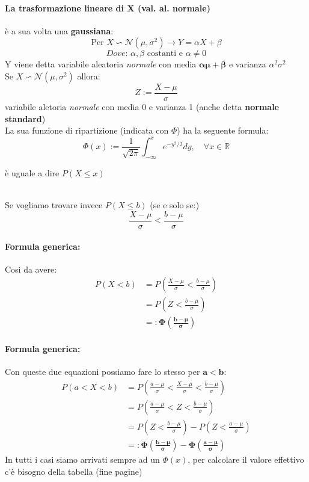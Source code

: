 \documentclass[]{article}
\newcommand{\formula}{\paragraph{Formula generica:}}
\begin{document}
    \paragraph{La trasformazione lineare di X (val. al. normale)} è a sua volta una \textbf{gaussiana}:
    \[ \text{Per } X \backsim  \mathcal{N} (\mu, \sigma^2) \longrightarrow Y = \alpha X + \beta \]
    \[ \textit{Dove: } \alpha, \beta \text{ costanti e } \alpha \not= 0\]
    Y viene detta variabile aleatoria \textit{normale} con media $\boldsymbol{\alpha \mu + \beta}$ e varianza $\alpha^2 \sigma^2$ \\
    Se $X \backsim \mathcal{N}(\mu, \sigma^2)$ allora:
    \[ Z := \frac{X - \mu}{\sigma}\]
    variabile aletoria \textit{normale} con media 0 e varianza 1 (anche detta \textbf{normale standard}) \\
    La sua funzione di ripartizione (indicata con $\Phi$) ha la seguente formula:
    \begin{equation*}
        \Phi(x):=\frac{1}{\sqrt{2 \pi}} \int_{-\infty}^x e^{-y^2 / 2} d y, \quad \forall x \in \mathbb{R}
    \end{equation*}
    \centerline{è uguale a dire $P(X \leq x)$} \\
    \linebreak[4]
    Se vogliamo trovare invece $P(X \leq b)$ (se e solo se:)
    \[ \frac{X - \mu}{\sigma} < \frac{b - \mu}{\sigma}\]
    \formula Cosi da avere: 
    \begin{equation*}
        \begin{split}
            P(X < b) &= P(\frac{X - \mu}{\sigma} < \frac{b - \mu}{\sigma}) \\
            &= P(Z < \frac{b - \mu}{\sigma}) \\
            & =: \boldsymbol{\Phi(\frac{b - \mu}{\sigma})}
        \end{split}
    \end{equation*}

    \formula Con queste due equazioni possiamo fare lo stesso per $\boldsymbol{a < b}$:
    \begin{equation*}
        \begin{split}
            P(a < X < b) &= P(\frac{a - \mu}{\sigma} < \frac{X - \mu}{\sigma} < \frac{b - \mu}{\sigma}) \\
            &= P(\frac{a - \mu}{\sigma} < Z < \frac{b - \mu}{\sigma}) \\
            &= P(Z < \frac{b - \mu}{\sigma}) - P(Z < \frac{a - \mu}{\sigma}) \\
            &=: \boldsymbol{\Phi (\frac{b - \mu}{\sigma}) - \Phi(\frac{a - \mu}{\sigma})}
        \end{split}
    \end{equation*}
    In tutti i casi siamo arrivati sempre ad un $\Phi(x)$, per calcolare il valore effettivo c'è bisogno della tabella (fine pagine)
    \newpage
\end{document}
